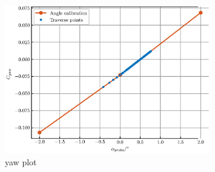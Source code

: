 \documentclass{article}
\begin{document}
\begin{figure}[H]
    \centering
    \includegraphics[width=0.8\textwidth]{figures/yaw_plot.eps}
    \caption{yaw plot}
    \label{fig:yaw_plot}
\end{figure}
\end{document}
